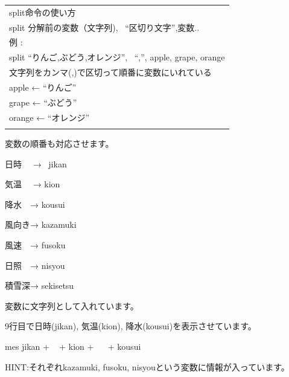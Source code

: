 \begin{table}[htbp]
    \centering
    \begin{tabular}{|l|}
        \hline
        
        split命令の使い方\\

        split 分解前の変数（文字列), \ “区切り文字”,変数..\\
        例 : \\
        split “りんご,ぶどう,オレンジ”, \ “,”, apple, grape, orange\\
        文字列をカンマ(,)で区切って順番に変数にいれている\\

        apple ← “りんご”\\

        grape ← “ぶどう”\\

        orange ← “オレンジ”\\
        \\\hline
    \end{tabular}
\end{table}



\bigskip


\bigskip

変数の順番も対応させます。

日時 　→ \ jikan

気温　 → kion 　

降水　→ kousui

風向き→ kazamuki

風速　→ fusoku

日照　→ nisyou

積雪深→ sekisetsu

変数に文字列として入れています。


\bigskip

9行目で日時(jikan), 気温(kion),
降水(kousui)を表示させています。

mes jikan + {\textquotedbl} \ {\textquotedbl} + kion + {\textquotedbl} \ \ {\textquotedbl} + kousui


\clearpage
\begin{tcolorbox}[title=\useOmetoi,breakable]\label{Q:amedas1}
  \begin{enumerate}
    HINT:それぞれkazamuki, fusoku, nisyouという変数に情報が入っています。
  \end{enumerate}
\end{tcolorbox}

